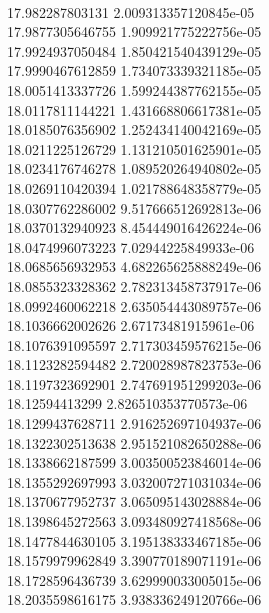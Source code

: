 { \\
17.982287803131 2.009313357120845e-05
 \\
17.9877305646755 1.909921775222756e-05
 \\
17.9924937050484 1.850421540439129e-05
 \\
17.9990467612859 1.734073339321185e-05
 \\
18.0051413337726 1.599244387762155e-05
 \\
18.0117811144221 1.431668806617381e-05
 \\
18.0185076356902 1.252434140042169e-05
 \\
18.0211225126729 1.131210501625901e-05
 \\
18.0234176746278 1.089520264940802e-05
 \\
18.0269110420394 1.021788648358779e-05
 \\
18.0307762286002 9.517666512692813e-06
 \\
18.0370132940923 8.454449016426224e-06
 \\
18.0474996073223 7.02944225849933e-06
 \\
18.0685656932953 4.682265625888249e-06
 \\
18.0855323328362 2.782313458737917e-06
 \\
18.0992460062218 2.635054443089757e-06
 \\
18.1036662002626 2.67173481915961e-06
 \\
18.1076391095597 2.717303459576215e-06
 \\
18.1123282594482 2.720028987823753e-06
 \\
18.1197323692901 2.747691951299203e-06
 \\
18.12594413299 2.826510353770573e-06
 \\
18.1299437628711 2.916252697104937e-06
 \\
18.1322302513638 2.951521082650288e-06
 \\
18.1338662187599 3.003500523846014e-06
 \\
18.1355292697993 3.032007271031034e-06
 \\
18.1370677952737 3.065095143028884e-06
 \\
18.1398645272563 3.093480927418568e-06
 \\
18.1477844630105 3.195138333467185e-06
 \\
18.1579979962849 3.390770189071191e-06
 \\
18.1728596436739 3.629990033005015e-06
 \\
18.2035598616175 3.938336249120766e-06
 \\
}
